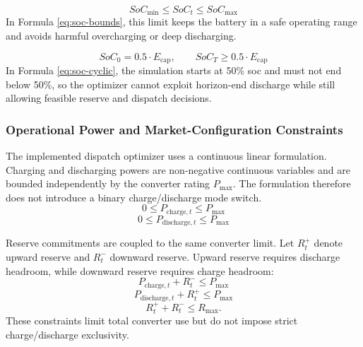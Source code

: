 \begin{equation}\label{eq:soc-bounds}
    SoC_{\min} \leq SoC_{t} \leq SoC_{\max}
\end{equation}
In Formula \ref{eq:soc-bounds}, this limit keeps the battery in a safe operating range and avoids harmful overcharging or deep discharging.

\begin{equation}\label{eq:soc-cyclic}
    SoC_{0} = 0.5 \cdot E_{\text{cap}},
    \qquad
    SoC_{T} \ge 0.5 \cdot E_{\text{cap}}
\end{equation}
In Formula \ref{eq:soc-cyclic}, the simulation starts at 50\% \gls{soc} and must not end below 50\%, so the optimizer cannot exploit horizon-end discharge while still allowing feasible reserve and dispatch decisions.

\subsubsection{Operational Power and Market-Configuration Constraints}
The implemented dispatch optimizer uses a continuous linear formulation. Charging and discharging powers are non-negative continuous variables and are bounded independently by the converter rating $P_{\text{max}}$. The formulation therefore does not introduce a binary charge/discharge mode switch.
\begin{equation}\label{eq:charging_limit}
    0 \le P_{\text{charge},t} \le P_{\max}
\end{equation}
\begin{equation}\label{eq:discharging_limit}
    0 \le P_{\text{discharge},t} \le P_{\max}
\end{equation}

Reserve commitments are coupled to the same converter limit. Let $R_t^{+}$ denote upward reserve and $R_t^{-}$ downward reserve. Upward reserve requires discharge headroom, while downward reserve requires charge headroom:
\begin{equation}\label{eq:reserve-power-coupling}
    P_{\text{charge},t} + R^{-}_{t} \le P_{\max}
\end{equation}
\begin{equation}\label{eq:reserve-power-coupling-pos}
    P_{\text{discharge},t} + R^{+}_{t} \le P_{\max}
\end{equation}
\begin{equation}\label{eq:reserve-total-limit}
    R^{+}_{t}+R^{-}_{t}\le R_{\max}.
\end{equation}
These constraints limit total converter use but do not impose strict charge/discharge exclusivity.

